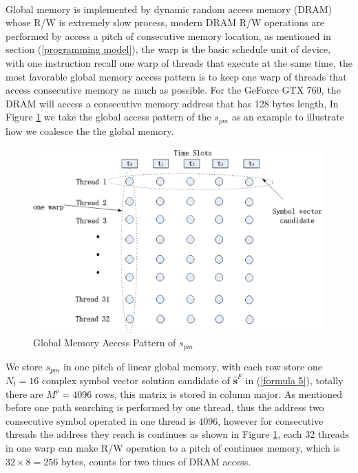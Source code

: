 \documentclass[12pt,a4paper,final]{article}
\begin{document}
\begin{spacing}{2.5}
  \paragraph{}Global memory is implemented by dynamic random access memory (DRAM) whose R/W is extremely slow process, modern DRAM R/W operations are performed by access a pitch of consecutive memory location, as mentioned in section (\ref{programming model}), the warp is the basic schedule unit of device, with one instruction recall one warp of threads that execute at the same time, the most favorable global memory access pattern is to keep one warp of threads that access consecutive memory as much as possible. For the GeForce GTX 760, the DRAM will access a consecutive memory address that has 128 bytes length, In Figure \ref{coalesce global memory} we take the global access pattern of the $\mathit{s_{pm}}$ as an example to illustrate how we coalesce the the global memory.
  \begin{figure}[tb]
\centering
\includegraphics[scale=0.63]{coalescing_global_memory.eps}
\caption{Global Memory Access Pattern of $\mathit{s_{pm}}$}
\label{coalesce global memory}
\end{figure}
We store $\mathit{s_{pm}}$ in one pitch of linear global memory, with each row store one $N_{t}=16$ complex symbol vector solution candidate of $\mathbf{\hat{s}}^{F}$ in (\ref{formula 5}), totally there are $M^{\rho}=4096$ rows, this matrix is stored in column major. As mentioned before one path searching is performed by one thread, thus the address two consecutive symbol operated in one thread is $4096$, however for consecutive threads the address they reach is continues as shown in Figure \ref{coalesce global memory}, each 32 threads in one warp can make R/W operation to a pitch of continues memory, which is $32\times 8=256$ bytes, counts for two times of DRAM access.


\end{spacing}
\end{document}
